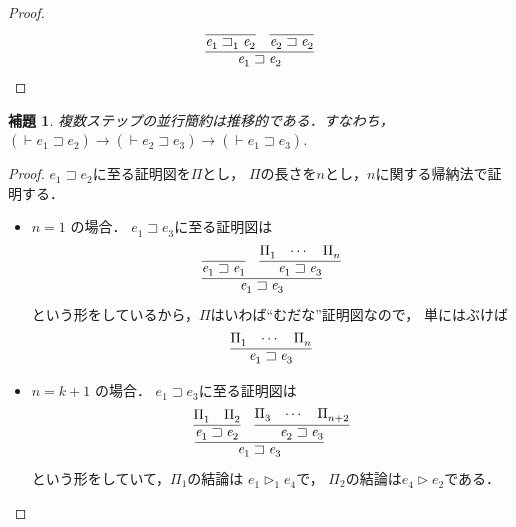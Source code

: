 \documentclass{ltjsbook}%
\newtheorem{lemma}{補題}[section]%
\begin{document}
\begin{proof}%
  \begin{equation}%
    \infer{%
      \mathit{e}_1^{}\sqsupset\mathit{e}_2^{}%
    }{%
      \infer{\mathit{e}_1^{}\sqsupset_1^{}\mathit{e}_2^{}}{}%
    &%
      \infer{\mathit{e}_2^{}\sqsupset\mathit{e}_2^{}}{}%
    }%
  \end{equation}%
\end{proof}%
\begin{lemma}%
  \label{lemma:par_reduct_trans}%
  複数ステップの並行簡約は推移的である．すなわち，%
  $(\vdash\mathit{e}_1^{}\sqsupset\mathit{e}_2^{})\rightarrow%
  (\vdash\mathit{e}_2^{}\sqsupset\mathit{e}_3^{})\rightarrow%
  (\vdash\mathit{e}_1^{}\sqsupset\mathit{e}_3^{})$.%
\end{lemma}%
\begin{proof}%
  $\mathit{e}_1^{}\sqsupset\mathit{e}_2^{}$に至る証明図を$\Pi$とし，%
  $\Pi$の長さを$n$とし，$n$に関する帰納法で証明する．%
  \begin{itemize}%
  \item $n=1$ の場合．%
    $\mathit{e}_1^{}\sqsupset\mathit{e}_3^{}$に至る証明図は%
    \begin{equation}%
      \infer{%
        \mathit{e}_1^{}\sqsupset\mathit{e}_3^{}%
      }{%
        \infer{\mathit{e}_1^{}\sqsupset\mathit{e}_1^{}}{}%
      &%
        \infer{\mathit{e}_1^{}\sqsupset\mathit{e}_3^{}}{\Pi_1^{}&\cdots&\Pi_n^{}}%
      }%
    \end{equation}%
    という形をしているから，$\Pi$はいわば``むだな''証明図なので，%
    単にはぶけば%
    \begin{equation}%
      \infer{\mathit{e}_1^{}\sqsupset\mathit{e}_3^{}}{\Pi_1^{}&\cdots&\Pi_n^{}}%
    \end{equation}%
  \item $n=k + 1$ の場合．%
    $\mathit{e}_1^{}\sqsupset\mathit{e}_3^{}$に至る証明図は%
    \begin{equation}%
      \infer{%
        \mathit{e}_1^{}\sqsupset\mathit{e}_3^{}%
      }{%
        \infer{%
          \mathit{e}_1^{}\sqsupset\mathit{e}_2^{}%
        }{%
          \Pi_1^{}%
        &%
          \Pi_2^{}%
        }%
      &%
        \infer{%
          \mathit{e}_2^{}\sqsupset\mathit{e}_3^{}%
        }{%
          \Pi_3^{}&\cdots&\Pi_{n+2}^{}%
        }%
      }%
    \end{equation}%
    という形をしていて，$\Pi_1^{}$の結論は%
    $\mathit{e}_1^{}\triangleright_1^{}\mathit{e}_4^{}$で，%
    $\Pi_2^{}$の結論は$\mathit{e}_4^{}\triangleright\mathit{e}_2^{}$である．%

\end{itemize}
\end{proof}
\end{document}
